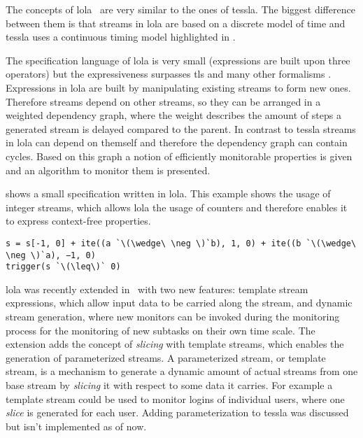 The concepts of \gls{lola}~\cite{DAngelo2005} are very similar to the ones of \gls{tessla}.
The biggest difference between them is that streams in \gls{lola} are based on a discrete model of time and \gls{tessla} uses a continuous timing model highlighted in .

The specification language of \gls{lola} is very small (expressions are built upon three operators) but the expressiveness surpasses \glspl{tl} and many other formalisms \citep{DAngelo2005}.
Expressions in \gls{lola} are built by manipulating existing streams to form new ones.
Therefore streams depend on other streams, so they can be arranged in a weighted dependency graph, where the weight describes the amount of steps a generated stream is delayed compared to the parent.
In contrast to \gls{tessla} streams in \gls{lola} can depend on themself and therefore the dependency graph can contain cycles.
Based on this graph a notion of efficiently monitorable properties is given and an algorithm to monitor them is presented.

 shows a small specification written in \gls{lola}.
This example shows the usage of integer streams, which allows \gls{lola} the usage of counters and therefore enables it to express context-free properties.

\begin{lstlisting}[escapeinside=``,numbers=none,float,label=listing:lola_spec, caption={[A specification written in \gls{lola}]A \gls{lola} specification describing the property that the number of \emph{a}\'s in a stream shall never be less then the number of \emph{b}\'s}]
s = s[-1, 0] + ite((a `\(\wedge\ \neg \)`b), 1, 0) + ite((b `\(\wedge\ \neg \)`a), −1, 0)
trigger(s `\(\leq\)` 0)
\end{lstlisting}

\Gls{lola} was recently extended in~\cite{Faymonville2016} with two new features:  template stream expressions, which allow input data to be carried along the stream, and dynamic stream generation, where new monitors can be invoked during the monitoring process for the monitoring of new subtasks on their own time scale.
The extension adds the concept of \emph{slicing} with template streams, which enables the generation of  parameterized streams.
A parameterized stream, or template stream, is a mechanism to generate a dynamic amount of actual streams from one base stream by \emph{slicing} it with respect to some data it carries.
For example a template stream could be used to monitor logins of individual users, where one \emph{slice} is generated for each user.
Adding parameterization to \gls{tessla} was discussed but isn't implemented as of now.


